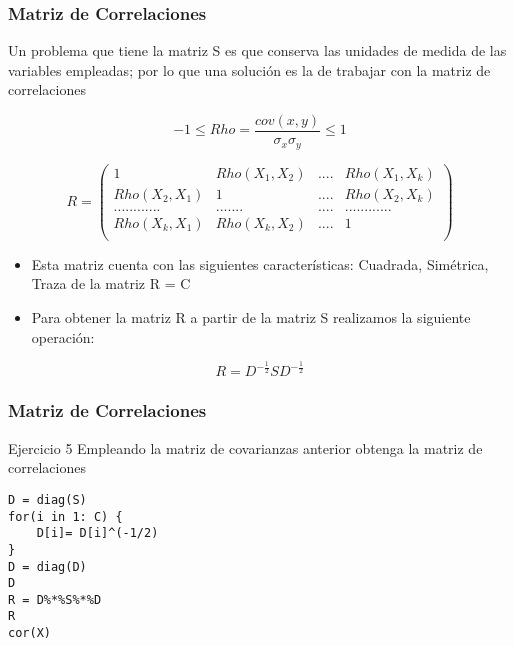 \documentclass[16.5pt]{beamer}
\begin{document}
{
\begin{frame}
\frametitle{\textbf{Matriz de Correlaciones}}
\hspace*{1mm}
\vspace*{-2mm} 
\vspace{0.2cm}

{\color{blue} Un problema que tiene la matriz S es que conserva las unidades de medida de las variables empleadas; por lo que una solución es la de trabajar con la matriz de correlaciones}

$$ -1 \leq Rho = \frac{cov(x,y)}{\sigma_x \sigma_y} \leq 1$$

$$R= \begin{pmatrix} 1 & Rho(X_1, X_2) & .... & Rho(X_1, X_k) \\
Rho(X_2, X_1) & 1 & .... & Rho(X_2, X_k) \\
............  & .......   & .... & ............ \\
Rho(X_k, X_1) & Rho(X_k, X_2) & .... & 1 \\
\end{pmatrix}$$

\begin{itemize}
\item Esta matriz cuenta con las siguientes características: Cuadrada, Simétrica, Traza de la matriz R = C
\item Para obtener la matriz R a partir de la matriz S realizamos la siguiente operación:
\end{itemize}

$$ R = D^{-\frac{1}{2}}SD^{-\frac{1}{2}}$$

\end{frame}
}


{
\begin{frame}
\frametitle{\textbf{Matriz de Correlaciones}}
\hspace*{1mm}
\vspace*{-2mm} 
\vspace{0.2cm}

\begin{bclogo}{Ejercicio 5}
 {\color{blue} Empleando la matriz de covarianzas anterior obtenga la matriz de correlaciones}
\begin{lstlisting}[basicstyle=\small]
D = diag(S)
for(i in 1: C) {
    D[i]= D[i]^(-1/2)
}
D = diag(D)
D
R = D%*%S%*%D
R
cor(X)
\end{lstlisting}
\end{bclogo}
\end{frame}
}
\end{document}
